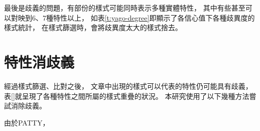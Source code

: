 最後是歧義的問題，有部份的樣式可能同時表示多種實體特性，
其中有些甚至可以對映到6、7種特性以上，
如表\ref{t:yago-degree}即顯示了各信心值下各種歧異度的樣式統計，
在樣式篩選時，會將歧異度太大的樣式捨去。



\section{特性消歧義}
\label{s:pattern-disambiguity}

經過樣式篩選、比對之後，
文章中出現的樣式可以代表的特性仍可能具有歧義，
表\ref{}就呈現了各種特性之間所屬的樣式重疊的狀況。
本研究使用了以下幾種方法嘗試消除歧義。

由於PATTY，



